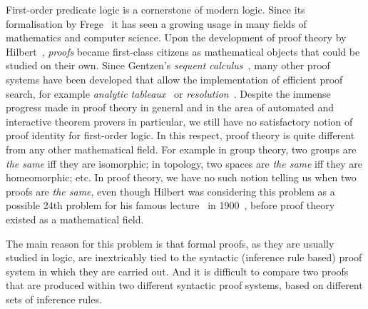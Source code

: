 \documentclass[conference,twosided,10pt]{IEEEtran}
\theoremstyle{definition}
\begin{document}
First-order predicate logic is a cornerstone of modern
logic. Since its formalisation by Frege~\cite{frege:79} it has seen a
growing usage in many fields of mathematics and computer science. Upon
the development of proof theory by Hilbert~\cite{hilbert:22},
\emph{proofs} became first-class citizens as mathematical objects that
could be studied on their own. Since Gentzen's \emph{sequent
calculus}~\cite{gentzen:35:I,gentzen:35:II}, many other proof systems
have been developed that allow the implementation of efficient proof
search, for example \emph{analytic tableaux}~\cite{smullyan:68} or
\emph{resolution}~\cite{robinson:65}. Despite the immense progress
made in proof theory in general and in the area of
automated and interactive theorem provers in
particular, we still have
no satisfactory notion of proof identity for first-order logic. In
this respect, proof theory is quite different from any other
mathematical field. For example in group theory, two groups are
\emph{the same} iff they are isomorphic; in topology, two spaces are
\emph{the same} iff they are homeomorphic; etc. In proof theory, we
have no such notion telling us when two proofs are \emph{the same},
even though Hilbert was considering this problem as a possible 24th
problem for his famous lecture~\cite{hilbert:00} in
1900~\cite{thiele:03}, before proof theory existed as a mathematical
field.

The main reason for this problem is that formal proofs, as they are
usually studied in logic, are inextricably tied to the syntactic
(inference rule based) proof system in which they are carried out. And
it is difficult to compare two proofs that are produced within two
different syntactic proof systems, based on different sets of inference rules.
\end{document}
